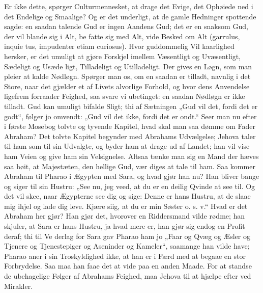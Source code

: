 \documentclass[12pt]{book}
\newcommand{\opage}[1]{\marginnote{\footnotesize\textit{[#1]}}}
\begin{document}
Er ikke dette, spørger Culturmennesket, at drage
det Evige, det Ophøiede ned i det Endelige og Smaalige?
Og er det underligt, at de gamle Hedninger spottende
sagde: en saadan talende Gud er ingen Aandens Gud;
det er en snaksom Gud, der vil blande sig i Alt, be\-%
fatte sig med Alt, vide Besked om Alt (garrulus, inquie\-%
tus, impudenter etiam curiosus). Hvor guddommelig Vil\-%
kaarlighed hersker, er det umuligt at gjøre Forskjel
imellem Væsentligt og Uvæsentligt, Sædeligt og Usæde\-%
ligt, Tilladeligt og Utilladeligt. Der gives en Løgn, som
man pleier at kalde Nødløgn. Spørger man os, om en
\opage{181}\setcounter{footnote}{0}%
saadan er tilladt, navnlig i det Store, naar det gjælder
et af Livets alvorlige Forhold, og hvor dens Anvendelse
ligefrem forraader Feighed, saa svare vi ubetinget: en
saadan Nødløgn er ikke tilladt. Gud kan umuligt bifalde
Sligt; thi af Sætningen „Gud vil det, fordi det er godt“,
følger jo omvendt: „Gud vil det ikke, fordi det er ondt.“
Seer man nu efter i første Mosebog tolvte og tyvende
Kapitel, hvad skal man saa dømme om Fader Abraham?
Det tolvte Kapitel begynder med Abrahams Udvælgelse;
Jehova taler til ham som til sin Udvalgte, og byder ham
at drage ud af Landet; han vil vise ham Veien og give
ham sin Velsignelse. Altsaa tænke man sig en Mand
der hæves saa høit, at Majestæten, den hellige Gud, vær\-%
diges at tale til ham. Saa kommer Abraham til Pharao i
Ægypten med Sara, og hvad gjør han nu? Han bliver
bange og siger til sin Hustru: „See nu, jeg veed,
at du er en deilig Qvinde at see til. Og det vil skee,
naar Ægypterne see dig og sige: Denne er hans Hustru,
at de slaae mig ihjel og lade dig leve. Kjære siig, at
du er min Søster o. s. v.“ Hvad er det Abraham her
gjør? Han gjør det, hvorover en Riddersmand vilde
rødme; han skjuler, at Sara er hans Hustru, ja hvad
mere er, han gjør sig endog en Profit deraf; thi til Ve\-%
derlag for Sara gav Pharao ham jo „Faar og Qvæg og
Æsler og Tjenere og Tjenestepiger og Aseninder og
Kameler“, saamange han vilde have; Pharao aner i sin
Troskyldighed ikke, at han er i Færd med at begaae en
stor Forbrydelse. Saa maa han faae det at vide paa en
anden Maade. For at standse de ubehagelige Følger af
Abrahams Feighed, maa Jehova til at hjælpe efter ved
Mirakler.
\end{document}
